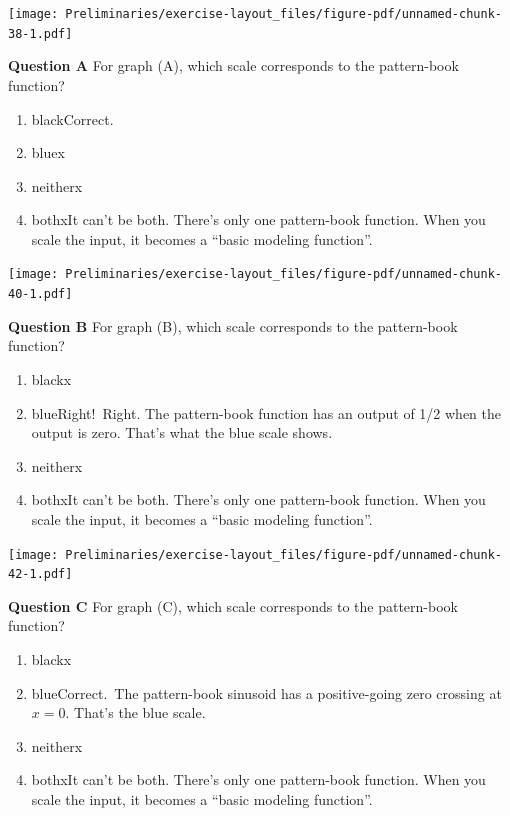 \documentclass[
  letterpaper,
  DIV=11,
  numbers=noendperiod,
  oneside]{article}
\providecommand{\tightlist}{%
  \setlength{\itemsep}{0pt}\setlength{\parskip}{0pt}}\usepackage{longtable,booktabs,array}
\begin{document}
\begin{multicols}{2}
\texttt{[image: Preliminaries/exercise-layout\_files/figure-pdf/unnamed-chunk-38-1.pdf]}

\textbf{Question A} For graph (A), which scale corresponds to the
pattern-book function?

\begin{enumerate}
\def\labelenumi{\roman{enumi}.}
\tightlist
\item
  {black{Correct.~}}\\
\item
  {blue{x}}\\
\item
  {neither{x}}\\
\item
  {both{xIt can't be both. There's only one pattern-book function.
  When you scale the input, it becomes a ``basic modeling function''.}}
\end{enumerate}

\texttt{[image: Preliminaries/exercise-layout\_files/figure-pdf/unnamed-chunk-40-1.pdf]}

\textbf{Question B} For graph (B), which scale corresponds to the
pattern-book function?

\begin{enumerate}
\def\labelenumi{\roman{enumi}.}
\tightlist
\item
  {black{x}}\\
\item
  {blue{Right!~Right. The pattern-book function has an output of 1/2
  when the output is zero. That's what the blue scale shows. }}\\
\item
  {neither{x}}\\
\item
  {both{xIt can't be both. There's only one pattern-book function.
  When you scale the input, it becomes a ``basic modeling function''.}}
\end{enumerate}

\texttt{[image: Preliminaries/exercise-layout\_files/figure-pdf/unnamed-chunk-42-1.pdf]}

\textbf{Question C} For graph (C), which scale corresponds to the
pattern-book function?

\begin{enumerate}
\def\labelenumi{\roman{enumi}.}
\tightlist
\item
  {black{x}}\\
\item
  {blue{Correct.~The pattern-book sinusoid has a positive-going zero
  crossing at \(x=0\). That's the blue scale.}}\\
\item
  {neither{x}}\\
\item
  {both{xIt can't be both. There's only one pattern-book function.
  When you scale the input, it becomes a ``basic modeling function''.}}
\end{enumerate}


\end{multicols}
\end{document}
